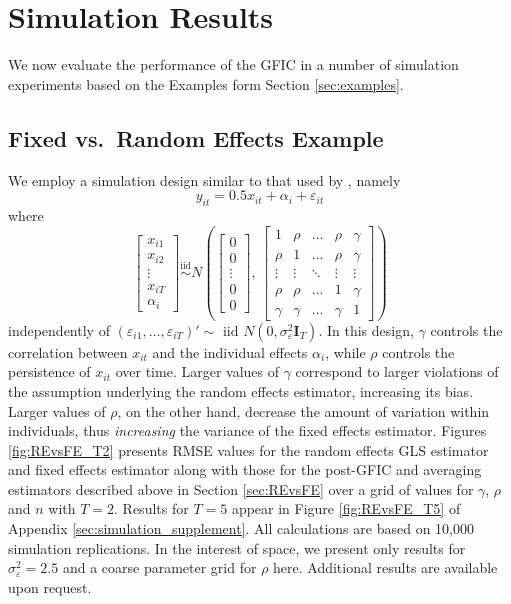 \section{Simulation Results}
\label{sec:simulation}
We now evaluate the performance of the GFIC in a number of simulation experiments based on the Examples form Section \ref{sec:examples}.

\subsection{Fixed vs.\ Random Effects Example}
\label{sec:REvsFEsim}
We employ a simulation design similar to that used by \cite{GuggenbergerRE}, namely
\begin{equation*}
  y_{it} = 0.5 x_{it} + \alpha_i + \varepsilon_{it}
\end{equation*}
where
\[
  \begin{bmatrix}
x_{i1}\\
x_{i2}\\
\vdots\\
x_{iT}\\
\alpha_i
\end{bmatrix}  \overset{\mbox{iid}}{\sim} N \left (
\begin{bmatrix}
0\\
0\\
\vdots\\
0\\
0
\end{bmatrix} , \, 
\begin{bmatrix}
1 & \rho & \ldots & \rho & \gamma\\
\rho & 1 & \ldots & \rho & \gamma\\
\vdots & \vdots&  \ddots & \vdots &\vdots\\
\rho & \rho & \ldots & 1 & \gamma\\
\gamma& \gamma &\ldots& \gamma & 1 
\end{bmatrix}
\right)
\]
independently of $\left( \varepsilon_{i1}, \dots, \varepsilon_{iT} \right)' \sim \mbox{ iid } N(0, \sigma_{\varepsilon}^2 \mathbf{I}_T)$.
In this design, $\gamma$ controls the correlation between $x_{it}$ and the individual effects $\alpha_i$, while $\rho$ controls the persistence of $x_{it}$ over time.
Larger values of $\gamma$ correspond to larger violations of the assumption underlying the random effects estimator, increasing its bias.
Larger values of $\rho$, on the other hand, decrease the amount of variation within individuals, thus \emph{increasing} the variance of the fixed effects estimator. 
Figures \ref{fig:REvsFE_T2} presents RMSE values for the random effects GLS estimator and fixed effects estimator along with those for the post-GFIC and averaging estimators described above in Section \ref{sec:REvsFE} over a grid of values for $\gamma$, $\rho$ and $n$ with $T=2$.
Results for $T=5$ appear in Figure \ref{fig:REvsFE_T5} of Appendix \ref{sec:simulation_supplement}.
All calculations are based on 10,000 simulation replications.
In the interest of space, we present only results for $\sigma_{\varepsilon}^2 = 2.5$ and a coarse parameter grid for $\rho$ here. 
Additional results are available upon request.
 

